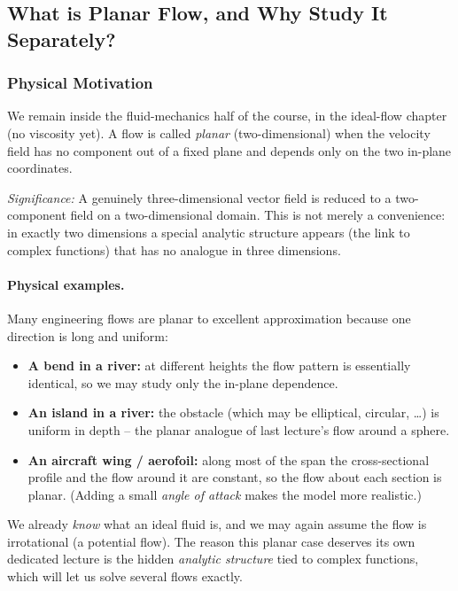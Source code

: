 \documentclass[../main.tex]{subfiles}
\begin{document}
\subsection{What is Planar Flow, and Why Study It Separately?}\label{sec:lec17:def}

\subsubsection*{Physical Motivation}
We remain inside the fluid-mechanics half of the course, in the ideal-flow chapter (no viscosity yet). A flow is called \emph{planar} (two-dimensional) when the velocity field has no component out of a fixed plane and depends only on the two in-plane coordinates.

\textit{Significance:} A genuinely three-dimensional vector field is reduced to a two-component field on a two-dimensional domain. This is not merely a convenience: in exactly two dimensions a special analytic structure appears (the link to complex functions) that has no analogue in three dimensions.

\paragraph{Physical examples.} Many engineering flows are planar to excellent approximation because one direction is long and uniform:
\begin{itemize}
  \item \textbf{A bend in a river:} at different heights the flow pattern is essentially identical, so we may study only the in-plane dependence.
  \item \textbf{An island in a river:} the obstacle (which may be elliptical, circular, \dots) is uniform in depth -- the planar analogue of last lecture's flow around a sphere.
  \item \textbf{An aircraft wing / aerofoil:} along most of the span the cross-sectional profile and the flow around it are constant, so the flow about each section is planar. (Adding a small \emph{angle of attack} makes the model more realistic.)
\end{itemize}
We already \emph{know} what an ideal fluid is, and we may again assume the flow is irrotational (a potential flow). The reason this planar case deserves its own dedicated lecture is the hidden \emph{analytic structure} tied to complex functions, which will let us solve several flows exactly.
\end{document}

